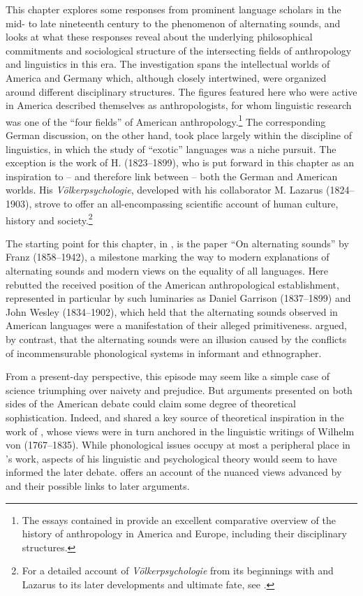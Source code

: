 \documentclass[output=paper]{langscibook}
\begin{document}
This chapter explores some responses from prominent language scholars in the mid- to late nineteenth century to the phenomenon of alternating sounds, and looks at what these responses reveal about the underlying philosophical commitments and sociological structure of the intersecting fields of anthropology and linguistics in this era. The investigation spans the intellectual worlds of America and Germany which, although closely intertwined, were organized around different disciplinary structures. The figures featured here who were active in America described themselves as anthropologists, for whom linguistic research was one of the ``four fields'' of American anthropology.\footnote{The essays contained in \citet{Kuklick2008} provide an excellent comparative overview of the history of anthropology in America and Europe, including their disciplinary structures.} The corresponding German discussion, on the other hand, took place largely within the discipline of linguistics, in which the study of ``exotic'' languages was a niche pursuit. The exception is the work of H. {\Steinthal} (1823--1899), who is put forward in this chapter as an inspiration to -- and therefore link between -- both the German and American worlds. His \emph{Völkerpsychologie}, developed with his collaborator M. Lazarus (1824--1903), strove to offer an all-encompassing scientific account of human culture, history and society.\footnote{For a detailed account of \emph{Völkerpsychologie} from its beginnings with {\Steinthal} and Lazarus to its later developments and ultimate fate, see \citet{Klautke2013}.}

The starting point for this chapter, in , is the \citeyear{Boas1889} paper ``On alternating sounds'' by Franz {\Boas} (1858--1942), a milestone marking the way to modern explanations of alternating sounds and modern views on the equality of all languages. Here {\Boas} rebutted the received position of the American anthropological establishment, represented in particular by such luminaries as Daniel Garrison {\Brinton} (1837--1899) and John Wesley {\Powell} (1834--1902), which held that the alternating sounds observed in American languages were a manifestation of their alleged primitiveness. {\Boas} argued, by contrast, that the alternating sounds were an illusion caused by the conflicts of incommensurable phonological systems in informant and ethnographer.

From a present-day perspective, this episode may seem like a simple case of science triumphing over naivety and prejudice. But arguments presented on both sides of the American debate could claim some degree of theoretical sophistication. Indeed, {\Brinton} and {\Boas} shared a key source of theoretical inspiration in the work of {\Steinthal}, whose views were in turn anchored in the linguistic writings of Wilhelm von {\Humboldt} (1767--1835). While phonological issues occupy at most a peripheral place in {\Steinthal}'s work, aspects of his linguistic and psychological theory would seem to have informed the later debate.  offers an account of the nuanced views advanced by {\Steinthal} and their possible links to later arguments.
\end{document}
